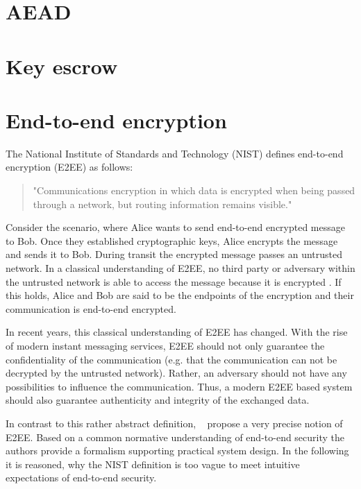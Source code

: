 \documentclass[../main.tex]{subfiles}
\begin{document}
\section{AEAD}

\section{Key escrow}

\section{End-to-end encryption}

The National Institute of Standards and Technology (NIST) defines end-to-end encryption (E2EE) as follows:
\begin{quote}
"Communications encryption in which data is encrypted when being passed through a network, but routing information remains visible."~\cite[88]{Nieles2017}
\end{quote}
Consider the scenario, where Alice wants to send end-to-end encrypted message to Bob.
Once they established cryptographic keys, Alice encrypts the message and sends it to Bob.
During transit the encrypted message passes an untrusted network.
In a classical understanding of E2EE, no third party or adversary within the untrusted network is able to access the message because it is encrypted \cite{Ermoshina2016}.
If this holds, Alice and Bob are said to be the endpoints of the encryption and their communication is end-to-end encrypted.

In recent years, this classical understanding of E2EE has changed. 
With the rise of modern instant messaging services, E2EE should not only guarantee the confidentiality of the communication (e.g. that the communication can not be decrypted by the untrusted network).
Rather, an adversary should not have any possibilities to influence the communication.
Thus, a modern E2EE based system should also guarantee authenticity and integrity of the exchanged data. \cite{Hale2022}






In contrast to this rather abstract definition, \citeauthor{Hale2022}~\cite{Hale2022} propose a very precise notion of E2EE.
Based on a common normative understanding of end-to-end security the authors provide a formalism supporting practical system design.
In the following it is reasoned, why the NIST definition is too vague to meet intuitive expectations of end-to-end security.
\end{document}
